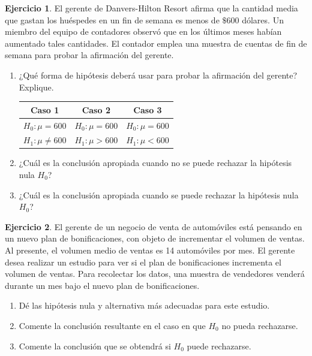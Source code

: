 \documentclass[
  11pt,
]{book}
\providecommand{\tightlist}{%
  \setlength{\itemsep}{0pt}\setlength{\parskip}{0pt}}
\theoremstyle{definition}
\theoremstyle{definition}
\theoremstyle{definition}
\newtheorem{exercise}{Ejercicio}[chapter]
\theoremstyle{definition}
\theoremstyle{remark}
\begin{document}
\begin{exercise}

El gerente de Danvers-Hilton Resort afirma que la cantidad media que gastan los huéspedes en un fin de semana es menos de \(\$600\) dólares. Un miembro del equipo de contadores observó que en los últimos meses habían aumentado tales cantidades. El contador emplea una muestra de cuentas de fin de semana para probar la afirmación del gerente.

\begin{enumerate}
\def\labelenumi{\alph{enumi}.}
\tightlist
\item
  ¿Qué forma de hipótesis deberá usar para probar la afirmación del gerente? Explique.

  \begin{table}[H]
  \centering
  \begin{tabular}[t]{ccc}
  \toprule
  Caso 1 & Caso 2 & Caso 3\\
  \midrule
  $H_0: \mu = 600$ & $H_0: \mu = 600$ & $H_0: \mu = 600$\\
  $H_1: \mu \neq 600$ & $H_1: \mu > 600$ & $H_1:\mu < 600$\\
  \bottomrule
  \end{tabular}
  \end{table}
\item
  ¿Cuál es la conclusión apropiada cuando no se puede rechazar la hipótesis nula \(H_0\)?
\item
  ¿Cuál es la conclusión apropiada cuando se puede rechazar la hipótesis nula \(H_0\)?
\end{enumerate}

\end{exercise}

\begin{exercise}

El gerente de un negocio de venta de automóviles está pensando en un nuevo plan de bonificaciones, con objeto de incrementar el volumen de ventas. Al presente, el volumen medio de ventas es 14 automóviles por mes. El gerente desea realizar un estudio para ver si el plan de
bonificaciones incrementa el volumen de ventas. Para recolectar los datos, una muestra de vendedores venderá durante un mes bajo el nuevo plan de bonificaciones.

\begin{enumerate}
\def\labelenumi{\alph{enumi}.}
\tightlist
\item
  Dé las hipótesis nula y alternativa más adecuadas para este estudio.
\item
  Comente la conclusión resultante en el caso en que \(H_0\) no pueda rechazarse.
\item
  Comente la conclusión que se obtendrá si \(H_0\) puede rechazarse.
\end{enumerate}

\end{exercise}
\end{document}

